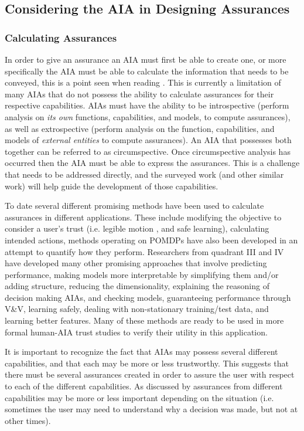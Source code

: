 \subsection{Considering the AIA in Designing Assurances} \label{sec:consider_AIA}
\subsubsection{Calculating Assurances}
    In order to give an assurance an AIA must first be able to create one, or more specifically the AIA must be able to calculate the information that needs to be conveyed, this is a point seen when reading \cite{Kaniarasu2013-ho,Chen2014-dk}. This is currently a limitation of many AIAs that do not possess the ability to calculate assurances for their respective capabilities. AIAs must have the ability to be introspective (perform analysis on \emph{its own} functions, capabilities, and models, to compute assurances), as well as extrospective (perform analysis on the function, capabilities, and  models of \emph{external entities} to compute assurances). An AIA that possesses both together can be referred to as circumspective. Once circumspective analysis has occurred then the AIA must be able to express the assurances. This is a challenge that needs to be addressed directly, and the surveyed work (and other similar work) will help guide the development of those capabilities.

    To date several different promising methods have been used to calculate assurances in different applications. These include modifying the objective to consider a user's trust (i.e. legible motion \cite{Dragan2013-wd}, and safe learning), calculating intended actions, methods operating on POMDPs have also been developed in an attempt to quantify how they perform. Researchers from quadrant III and IV have developed many other promising approaches that involve predicting performance, making models more interpretable by simplifying them and/or adding structure, reducing the dimensionality, explaining the reasoning of decision making AIAs, and checking models, guaranteeing performance through V\&V, learning safely, dealing with non-stationary training/test data, and learning better features. Many of these methods are ready to be used in more formal human-AIA trust studies to verify their utility in this application.

    It is important to recognize the fact that AIAs may possess several different capabilities, and that each may be more or less trustworthy. This suggests that there must be several assurances created in order to assure the user with respect to each of the different capabilities. As discussed by \cite{Chen2014-dk} assurances from different capabilities may be more or less important depending on the situation (i.e. sometimes the user may need to understand why a decision was made, but not at other times).

